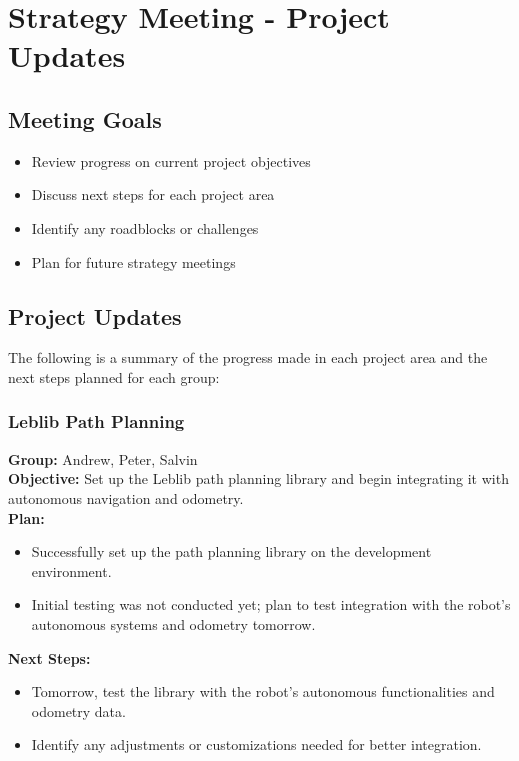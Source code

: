 \section{Strategy Meeting - Project Updates}

\subsection{Meeting Goals}
\begin{itemize}
    \item Review progress on current project objectives
    \item Discuss next steps for each project area
    \item Identify any roadblocks or challenges
    \item Plan for future strategy meetings
\end{itemize}

\subsection{Project Updates}
The following is a summary of the progress made in each project area and the next steps planned for each group:

\subsubsection{Leblib Path Planning}
\noindent
\textbf{Group:} Andrew, Peter, Salvin\\
\textbf{Objective:} Set up the Leblib path planning library and begin integrating it with autonomous navigation and odometry.\\
\textbf{Plan:}
\begin{itemize}
    \item Successfully set up the path planning library on the development environment.
    \item Initial testing was not conducted yet; plan to test integration with the robot's autonomous systems and odometry tomorrow.
\end{itemize}
\textbf{Next Steps:}
\begin{itemize}
    \item Tomorrow, test the library with the robot's autonomous functionalities and odometry data.
    \item Identify any adjustments or customizations needed for better integration.
\end{itemize}

